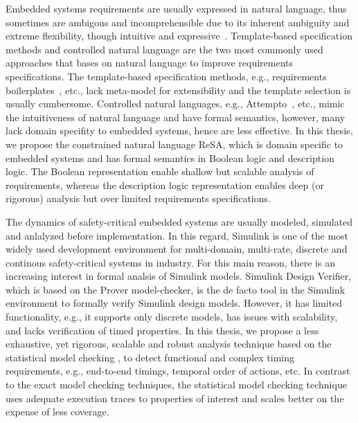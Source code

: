 Embedded systems requirements are usually expressed in natural language, thus sometimes are ambigous and incomprehensible due to its inherent ambiguity and extreme flexibility, though intuitive and expressive~\cite{ieereqspecstandard}. Template-based specification methods and controlled natural language are the two most commonly used approaches that bases on natural language to improve requirements specifications. The template-based specification methods, e.g., requirements boilerplates~\cite{Hull2011RequirementsEngineering}, etc.,  lack meta-model for extensibility and the template selection is usually cumbersome. Controlled natural languages, e.g., Attempto~\cite{attempto96}\cite{Fuchs2008AttemptoRepresentation}, etc., mimic the intuitiveness of natural language and have formal semantics, however, many lack domain specifity to embedded systems, hence are less effective. In this thesis, we propose the constrained natural language ReSA, which is domain specific to embedded systems and has formal semantics in Boolean logic and description logic. The Boolean representation enable shallow but scalable analysis of requirements, whereas the description logic representation enables deep (or rigorous) analysis but over limited requirements specifications.




The dynamics of safety-critical embedded systems are usually modeled, simulated and anlalyzed before implementation. In this regard, Simulink is one of the most widely used development environment for multi-domain, multi-rate, discrete and continous safety-critical systems in industry. For this main reason, there is an increasing interest in formal analsis of Simulink models. Simulink Design Verifier, which is based on the Prover model-checker, is the de facto tool in the Simulink environment to formally verify Simulink design models. However, it has limited functionality, e.g., it supports only discrete models, has issues with scalability, and lacks verification of timed properties. In this thesis, we propose a less exhaustive, yet rigorous, scalable and robust analysis technique based on the statistical model checking \cite{bibid}, to detect functional and complex timing requirements, e.g., end-to-end timings, temporal order of actions, etc. In contrast to the exact model checking techniques, the statistical model checking technique uses adequate execution traces to properties of interest and scales better on the expense of less coverage.

